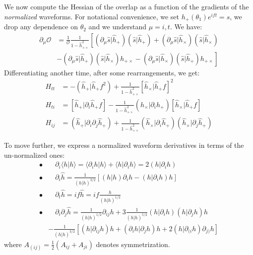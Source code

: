 \documentclass[twocolumn,showpacs,preprintnumbers,nofootinbib,prd,
superscriptaddress,10pt]{revtex4-2}
\newcommand{\scalar}[2]{\langle #1|#2 \rangle}
\newcommand{\rescalar}[2]{( #1 |#2 )}
\newcommand{\imscalar}[2]{[ #1|#2 ]}
\begin{document}
We now compute the Hessian of the overlap as a function of the gradients of the {\it normalized} waveforms. For notational convenience, we set $h_+(\theta_1)e^{ift} = s$, we drop any dependence on $\theta_2$ and we understand $\mu = {i, t}$.
We have:
\begin{align}\label{eq:overlap_grads}
	\partial_{\mu} \mathcal{O} &= \frac{1}{\mathcal{O}} \frac{1}{1-\hat{h}^2_{+\times}}
	\left[
	\rescalar{\partial_\mu\hat{s}}{\hat{h}_+}\rescalar{\hat{s}}{\hat{h}_+} 
	+ \rescalar{\partial_\mu\hat{s}}{\hat{h}_\times}\rescalar{\hat{s}}{\hat{h}_\times} \right. \nonumber \\
	&\left. - \rescalar{\partial_\mu\hat{s}}{\hat{h}_+}\rescalar{\hat{s}}{\hat{h}_\times}h_{+\times}
	- \rescalar{\partial_\mu\hat{s}}{\hat{h}_\times}\rescalar{\hat{s}}{\hat{h}_+}h_{+\times}
	\right]
\end{align}
Differentiating another time, after some rearrangements, we get:
\begin{align}
H_{tt} &= - \rescalar{\hat{h}_+}{\hat{h}_+f^2}
			+ \frac{1}{1-\hat{h}^2_{+\times}} \imscalar{\hat{h}_\times}{\hat{h}_+f}^2 \label{eq:H_tt}\\
H_{ti} &= \imscalar{\hat{h}_+}{\partial_i \hat{h}_+f}
			- \frac{1}{1-\hat{h}^2_{+\times}} \rescalar{\hat{h}_\times}{\partial_i\hat{h}_+} \imscalar{\hat{h}_\times}{\hat{h}_+f} \label{eq:H_ti}\\
H_{ij} &= \rescalar{\hat{h}_+}{\partial_i\partial_j\hat{h}_+}
			+ \frac{1}{1-\hat{h}^2_{+\times}} \rescalar{\hat{h}_\times}{\partial_i\hat{h}_+} \rescalar{\hat{h}_\times}{\partial_j\hat{h}_+} \label{eq:H_ij}
\end{align}

To move further, we express a normalized waveform derivatives in terms of the un-normalized ones:
\begin{align*}
	\bullet&\quad \partial_i \scalar{h}{h} = \scalar{\partial_i h}{h}+ \scalar{h}{\partial_i h} = 2 \rescalar{h}{\partial_i h} \\
	\bullet&\quad \partial_i \hat{h} =\frac{1}{\rescalar{h}{h}^{3/2}} \left[ \rescalar{h}{h}\partial_i h -  \rescalar{h}{\partial_i h} h \right]
	\\
	\bullet &\quad \partial_t \hat{h} = i f \hat{h} = i f \frac{h}{\rescalar{h}{h}^{1/2}} \\
	\bullet &\quad \partial_i \partial_j \hat{h} = \frac{1}{\rescalar{h}{h}^{1/2}} \partial_{ij}h 	+3 \frac{1}{\rescalar{h}{h}^{5/2}} \rescalar{h}{\partial_i h}\rescalar{h}{\partial_j h}h \\
	&- \frac{1}{\rescalar{h}{h}^{3/2}} \left[\rescalar{h}{ \partial_{ij} h} h + \rescalar{\partial_i h}{\partial_j h}  h
		+2\rescalar{h}{\partial_{(i} h} \partial_{j)} h \right]
\end{align*}
where $A_{(ij)} = \frac{1}{2}(A_{ij}+A_{ji})$ denotes symmetrization.
\end{document}
